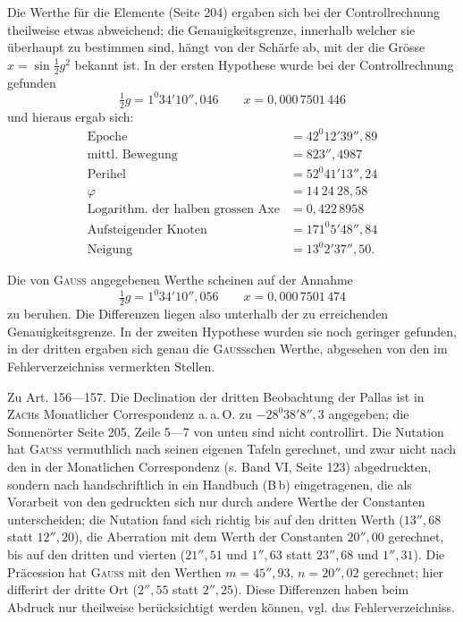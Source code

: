 Die Werthe für die Elemente (Seite 204) ergaben sich bei der Controllrechnung theilweise
etwas abweichend; die Genauigkeitsgrenze, innerhalb welcher sie überhaupt zu bestimmen
sind, hängt von der Schärfe ab, mit der die Grösse $x = \sin\tfrac12 g^2$ bekannt ist. In
der ersten Hypothese wurde bei der Controllrechnung gefunden
\[
\tfrac12 g = 1^0 34' 10''{,}046 \qquad x = 0{,}000\,7501\,446
\]
und hieraus ergab sich:
\[
\begin{aligned}
\text{Epoche} &= 42^0 12' 39''{,}89 \\
\text{mittl. Bewegung} &= 823''{,}4987 \\
\text{Perihel} &= 52^0 41' 13''{,}24 \\
\varphi &= 14\ 24\ 28{,}58 \\
\text{Logarithm. der halben grossen Axe} &= 0{,}422\,8958 \\
\text{Aufsteigender Knoten} &= 171^0 5' 48''{,}84 \\
\text{Neigung} &= 13^0 2' 37''{,}50.
\end{aligned}
\]

Die von \textsc{Gauss} angegebenen Werthe scheinen auf der Annahme
\[
\tfrac12 g = 1^0 34' 10''{,}056 \qquad x = 0{,}000\,7501\,474
\]
zu beruhen. Die Differenzen liegen also unterhalb der zu erreichenden Genauigkeitsgrenze.
In der zweiten Hypothese wurden sie noch geringer gefunden, in der dritten ergaben sich
genau die \textsc{Gauss}schen Werthe, abgesehen von den im Fehlerverzeichniss vermerkten
Stellen.

Zu Art. 156---157. Die Declination der dritten Beobachtung der Pallas ist in
\textsc{Zach}s Monatlicher Correspondenz a.\,a.\,O. zu $-28^0 38' 8''{,}3$ angegeben; die
Sonnenörter Seite 205, Zeile 5---7 von unten sind nicht controllirt. Die Nutation hat
\textsc{Gauss} vermuthlich nach seinen eigenen Tafeln gerechnet, und zwar nicht nach den in
der Monatlichen Correspondenz (s. Band VI, Seite 123) abgedruckten, sondern nach
handschriftlich in ein Handbuch (B\,b) eingetragenen, die als Vorarbeit von den gedruckten
sich nur durch andere Werthe der Constanten unterscheiden; die Nutation fand sich richtig
bis auf den dritten Werth ($13''{,}68$ statt $12''{,}20$), die Aberration mit dem Werth der
Constanten $20''{,}00$ gerechnet, bis auf den dritten und vierten ($21''{,}51$ und $1''{,}63$ statt
$23''{,}68$ und $1''{,}31$). Die Präcession hat \textsc{Gauss} mit den Werthen $m = 45''{,}93$,
$n = 20''{,}02$ gerechnet; hier differirt der dritte Ort ($2''{,}55$ statt $2''{,}25$). Diese
Differenzen haben beim Abdruck nur theilweise berücksichtigt werden können, vgl. das
Fehlerverzeichniss.


